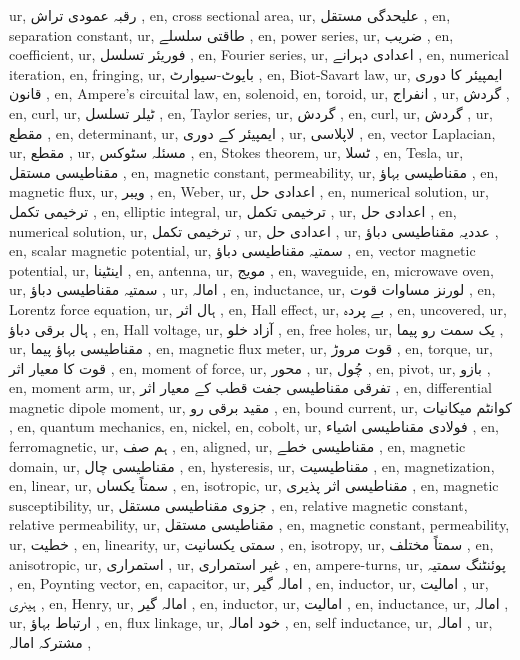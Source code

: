 ur, رقبہ عمودی تراش ,
en, cross sectional area,
ur, علیحدگی مستقل ,
en, separation constant,
ur, طاقتی سلسلے ,
en, power series,
ur, ضریب ,
en, coefficient,
ur, فوریئر تسلسل ,
en, Fourier series,
ur, اعدادی دہرانے ,
en, numerical iteration,
en, fringing,
ur, بایوٹ-سیوارٹ ,
en, Biot-Savart law,
ur, ایمپیئر کا دوری قانون ,
en, Ampere's circuital law,
en, solenoid,
en, toroid,
ur, انفراج ,
ur, گردش ,
en, curl,
ur, ٹیلر تسلسل ,
en, Taylor series,
ur, گردش ,
en, curl,
ur, گردش ,
ur, مقطع ,
en, determinant,
ur, ایمپیئر کے دوری ,
ur, لاپلاسی ,
en, vector Laplacian,
ur, مقطع ,
ur, مسئلہ سٹوکس ,
en, Stokes theorem,
ur, ٹسلا ,
en, Tesla,
ur, مقناطیسی مستقل ,
en, magnetic constant, permeability,
ur, مقناطیسی بہاؤ ,
en, magnetic flux,
ur, ویبر ,
en, Weber,
ur, اعدادی حل ,
en, numerical solution,
ur, ترخیمی تکمل ,
en, elliptic integral,
ur, ترخیمی تکمل ,
ur, اعدادی حل ,
en, numerical solution,
ur, ترخیمی تکمل ,
ur, اعدادی حل ,
ur, عددیہ مقناطیسی دباؤ ,
en, scalar magnetic potential,
ur, سمتیہ مقناطیسی دباؤ ,
en, vector magnetic potential,
ur, اینٹینا ,
en, antenna,
ur, مویج ,
en, waveguide,
en, microwave oven,
ur, سمتیہ مقناطیسی دباؤ ,
ur,  امالہ ,
en, inductance,
ur, لورنز مساوات قوت ,
en, Lorentz force equation,
ur, ہال اثر ,
en, Hall effect,
ur, بے پردہ ,
en, uncovered,
ur, ہال برقی دباؤ ,
en, Hall voltage,
ur, آزاد خلو ,
en, free holes,
ur, یک سمت رو پیما ,
ur, مقناطیسی بہاؤ پیما ,
en, magnetic flux meter,
ur, قوت مروڑ ,
en, torque,
ur, قوت کا معیار اثر ,
en, moment of force,
ur, محور ,
ur, چُول ,
en, pivot,
ur, بازو ,
en, moment arm,
ur, تفرقی مقناطیسی جفت قطب کے معیار اثر ,
en, differential magnetic dipole moment,
ur, مقید برقی رو ,
en, bound current,
ur, کوانٹم میکانیات ,
en, quantum mechanics,
en, nickel,
en, cobolt,
ur, فولادی مقناطیسی اشیاء ,
en, ferromagnetic,
ur, ہم صف ,
en, aligned,
ur, مقناطیسی خطے ,
en, magnetic domain,
ur, مقناطیسی چال ,
en, hysteresis,
ur, مقناطیسیت ,
en, magnetization,
en, linear,
ur, سمتاً یکساں ,
en, isotropic,
ur, مقناطیسی اثر پذیری ,
en, magnetic susceptibility,
ur, جزوی مقناطیسی مستقل ,
en, relative magnetic constant, relative permeability,
ur, مقناطیسی مستقل ,
en, magnetic constant, permeability,
ur, خطیت ,
en, linearity,
ur, سمتی یکسانیت  ,
en, isotropy,
ur, سمتاً مختلف ,
en, anisotropic,
ur, استمراری ,
ur, غیر استمراری ,
en, ampere-turns,
ur, پوئنٹنگ سمتیہ ,
en, Poynting vector,
en, capacitor,
ur, امالہ گیر ,
en, inductor,
ur, امالیت ,
ur, ہینری ,
en, Henry,
ur, امالہ گیر ,
en, inductor,
ur, امالیت ,
en, inductance,
ur, امالہ ,
ur, ارتباط بہاؤ ,
en, flux linkage,
ur, خود امالہ ,
en, self inductance,
ur, امالہ ,
ur, مشترکہ امالہ ,

